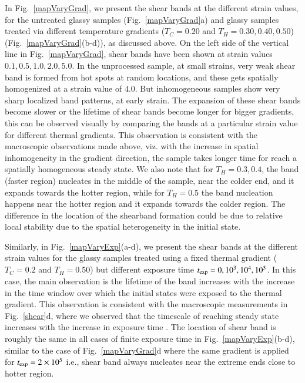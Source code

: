 In Fig.~\ref{mapVaryGrad}, we present the shear bands at the different strain values, for the untreated glassy samples (Fig.~\ref{mapVaryGrad}a) and  glassy samples treated via different temperature gradients ($T_C = 0.20 $ and $T_H = 0.30, 0.40, 0.50$) (Fig.~\ref{mapVaryGrad}(b-d)), as discussed above. On the left side of the vertical line in Fig.~\ref{mapVaryGrad}, shear bands have been shown at strain values $0.1, 0.5, 1.0, 2.0, 5.0$. In the unprocessed sample, at small strains, very weak shear band is formed from hot spots at random locations, and these gets spatially homogenized at a strain value of $4.0$. But inhomogeneous samples show very sharp localized band patterns, at early strain. The expansion of these shear bands become slower or the lifetime of shear bands become longer for bigger gradients, this can be observed visually by comparing the bands at a particular strain value for different thermal gradients. This observation is consistent with the macroscopic observations made above, viz. with the increase in spatial inhomogeneity in the gradient direction, the sample takes longer time for reach a spatially homogeneous steady state. We also note that for $T_H = 0.3, 0.4$, the band (faster region) nucleates in the middle of the sample, near the colder end, and it expands towards the hotter region, while for $T_H = 0.5$ the band nucleation happens near the hotter region and it expands towards the colder region. The difference in the location of the shearband formation could be due to relative local stability due to the spatial heterogeneity in the initial state.

Similarly, in Fig.~\ref{mapVaryExp}(a-d), we present the shear bands at the different strain values for the glassy samples treated using a fixed thermal gradient ($T_C = 0.2 $ and $T_H = 0.50$) but different exposure time $t_{\rm exp} = 0, 10^3, 10^4, 10^5$. In this case, the main observation is the lifetime of the band increases with the increase in the time window over which the initial states were exposed to the thermal gradient. This observation is consistent with the macroscopic measurements in Fig.~\ref{shear}d, where we observed that the timescale of reaching steady state increases with the increase in exposure time . The location of shear band is roughly the same in all cases of finite exposure time in Fig.~\ref{mapVaryExp}(b-d), similar to the case of Fig.~\ref{mapVaryGrad}d where the same gradient is applied for $t_{\rm exp} = 2\times10^5$ i.e., shear band always nucleates near the extreme ends close to hotter region.

